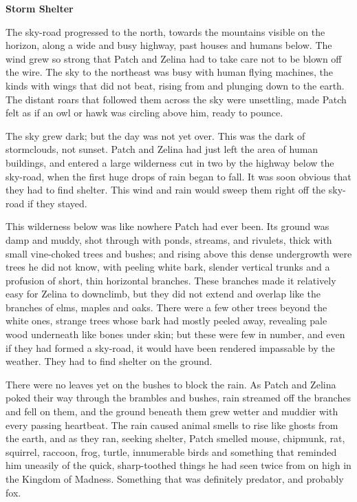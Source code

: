\documentclass[11pt]{article}
\begin{document}
\par
{\bf Storm Shelter\par
}\par
 The sky-road progressed to the north, towards the mountains visible on the horizon, along a wide and busy highway, past houses and humans below. The wind grew so strong that Patch and Zelina had to take care not to be blown off the wire. The sky to the northeast was busy with human flying machines, the kinds with wings that did not beat, rising from and plunging down to the earth. The distant roars that followed them across the sky were unsettling, made Patch felt as if an owl or hawk was circling above him, ready to pounce.\par
 The sky grew dark; but the day was not yet over. This was the dark of stormclouds, not sunset. Patch and Zelina had just left the area of human buildings, and entered a large wilderness cut in two by the highway below the sky-road, when the first huge drops of rain began to fall. It was soon obvious that they had to find shelter. This wind and rain would sweep them right off the sky-road if they stayed.\par
 This wilderness below was like nowhere Patch had ever been. Its ground was damp and muddy, shot through with ponds, streams, and rivulets, thick with small vine-choked trees and bushes; and rising above this dense undergrowth were trees he did not know, with peeling white bark, slender vertical trunks and a profusion of short, thin horizontal branches. These branches made it relatively easy for Zelina to downclimb, but they did not extend and overlap like the branches of elms, maples and oaks. There were a few other trees beyond the white ones, strange trees whose bark had mostly peeled away, revealing pale wood underneath like bones under skin; but these were few in number, and even if they had formed a sky-road, it would have been rendered impassable by the weather. They had to find shelter on the ground.\par
 There were no leaves yet on the bushes to block the rain. As Patch and Zelina poked their way through the brambles and bushes, rain streamed off the branches and fell on them, and the ground beneath them grew wetter and muddier with every passing heartbeat. The rain caused animal smells to rise like ghosts from the earth, and as they ran, seeking shelter, Patch smelled mouse, chipmunk, rat, squirrel, raccoon, frog, turtle, innumerable birds %
 and something that reminded him uneasily of the quick, sharp-toothed things he had seen twice from on high in the Kingdom of Madness. Something that was definitely predator, and probably fox.\par
\end{document}
